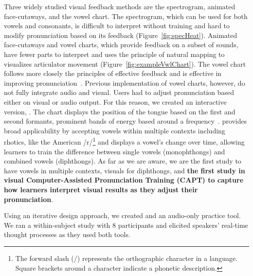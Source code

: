 Three widely studied visual feedback methods are the spectrogram, animated face-cutaways, and the vowel chart. The spectrogram, which can be used for both vowels and consonants, is difficult to interpret without training and hard to modify pronunciation based on its feedback (Figure~\ref{fig:specHeat}). Animated face-cutaways and vowel charts, which provide feedback on a subset of sounds, have fewer parts to interpret and uses the principle of natural mapping to visualizes articulator movement (Figure~\ref{fig:exampleVwlChart}). The vowel chart follows more closely the principles of effective feedback and is effective in improving pronunciation~\cite{rehman2021real,carey_call_2004}. Previous implementation of vowel charts, however, do not fully integrate audio and visual. Users had to adjust pronunciation based either on visual or audio output. For this reason, we created an interactive version, \visowel{}. The chart displays the position of the tongue based on the first and second formants, prominent bands of energy based around a frequency~\cite{schaferFormant1970}. \visowel{} provides broad applicability by accepting vowels within multiple contexts including rhotics, like the American /r/\footnote{The forward slash (/) represents the orthographic character in a language. Square brackets around a character indicate a phonetic description.} and displays a vowel's change over time, allowing learners to train the difference between single vowels (monophthongs) and combined vowels (diphthongs). As far as we are aware, we are the first study to have vowels in multiple contexts, visuals for diphthongs, and \textbf{the first study in visual Computer-Assisted Pronunciation Training (CAPT) to capture how learners interpret visual results as they adjust their pronunciation}.



Using an iterative design approach, we created \visowel{} and an audio-only practice tool. We ran a within-subject study with 8 participants and elicited speakers' real-time thought processes as they used both tools. 

